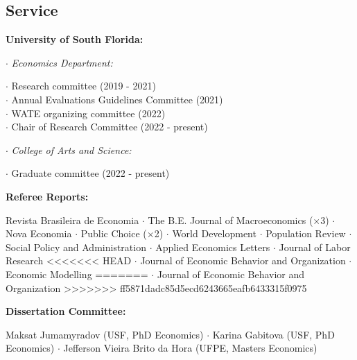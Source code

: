 \documentclass[mm, 10pt]{simple_style}
\begin{document}
\begin{resume}


\section{Service}

\textbf{University of South Florida:} 

$\cdot$ \indent \textit{Economics Department:} \\
\indent \hspace{1cm}  \begin{minipage}[t]{0.75\textwidth}
        $\cdot$ Research committee (2019 - 2021) \\
        $\cdot$ Annual Evaluations Guidelines Committee (2021) \\
        $\cdot$ WATE organizing committee (2022) \\
        $\cdot$ Chair of Research Committee (2022 - present)
        \end{minipage}

$\cdot$ \indent \textit{College of Arts and Science:} \\
\indent \hspace{1cm}  \begin{minipage}[t]{0.75\textwidth}
        $\cdot$ Graduate committee (2022 - present)  \\
        \end{minipage}


\textbf{Referee Reports:} \\
\indent \hspace{1cm}  \begin{minipage}[t]{0.75\textwidth}
Revista Brasileira de Economia 
$\cdot$ The B.E. Journal of Macroeconomics ($\times$3) 
$\cdot$ Nova Economia 
$\cdot$ Public Choice ($\times$2) 
$\cdot$ World Development 
$\cdot$ Population Review 
$\cdot$ Social Policy and Administration 
$\cdot$ Applied Economics Letters 
$\cdot$ Journal of Labor Research
<<<<<<< HEAD
$\cdot$ Journal of Economic Behavior and Organization
$\cdot$ Economic Modelling
=======
$\cdot$ Journal of Economic Behavior and Organization
>>>>>>> ff5871dadc85d5ecd6243665eafb6433315f0975
\end{minipage}

\textbf{Dissertation Committee:} \\
\indent \hspace{1cm}  \begin{minipage}[t]{0.75\textwidth}
        Maksat Jumamyradov (USF, PhD Economics)
        $\cdot$ Karina Gabitova (USF, PhD Economics)
        $\cdot$ Jefferson Vieira Brito da Hora (UFPE, Masters Economics)
        \end{minipage}        


\end{resume}
\end{document}
